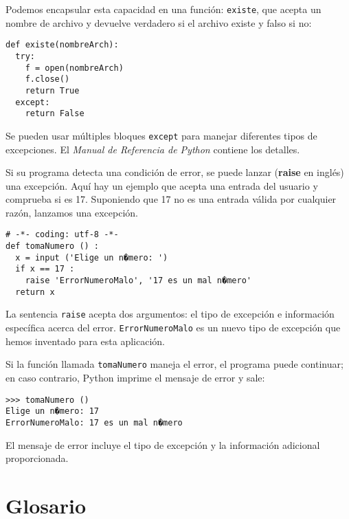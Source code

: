 Podemos encapsular esta capacidad en una función: \texttt{existe},
que acepta un nombre de archivo y devuelve verdadero si el archivo
existe y falso si no:
\begin{lstlisting}
def existe(nombreArch):
  try:
    f = open(nombreArch)
    f.close()
    return True
  except:
    return False
\end{lstlisting}
Se pueden usar múltiples bloques \texttt{except} para manejar diferentes
tipos de excepciones. El {\em Manual de Referencia de Python} contiene
los detalles.

Si su programa detecta una condición de error, se puede lanzar (\textbf{raise}
en inglés) una excepción. Aquí hay un ejemplo que acepta una entrada
del usuario y comprueba si es 17. Suponiendo que 17 no es una entrada
válida por cualquier razón, lanzamos una excepción.
\begin{lstlisting}
# -*- coding: utf-8 -*-
def tomaNumero () :                 
  x = input ('Elige un n�mero: ')   
  if x == 17 :
    raise 'ErrorNumeroMalo', '17 es un mal n�mero'
  return x
\end{lstlisting}

La sentencia \texttt{raise} acepta dos argumentos: el tipo de excepción
e información específica acerca del error. \texttt{ErrorNumeroMalo}
es un nuevo tipo de excepción que hemos inventado para esta aplicación.

Si la función llamada \texttt{tomaNumero} maneja el error, el programa
puede continuar; en caso contrario, Python imprime el mensaje de error
y sale:
\begin{lstlisting}
>>> tomaNumero ()
Elige un n�mero: 17
ErrorNumeroMalo: 17 es un mal n�mero
\end{lstlisting}

El mensaje de error incluye el tipo de excepción y la información
adicional proporcionada.

\section{Glosario}

